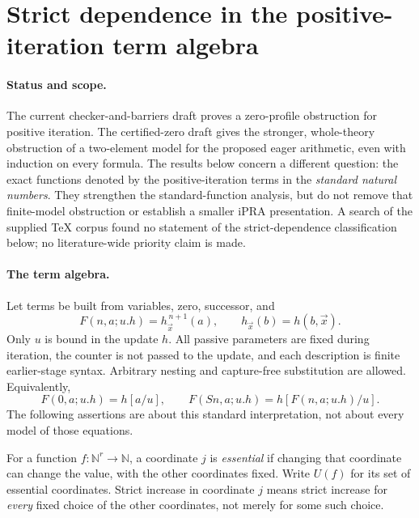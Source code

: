 
\section{Strict dependence in the positive-iteration term algebra}
\label{sec:positive-strict-dependence}

\paragraph{Status and scope.}
The current checker-and-barriers draft proves a zero-profile obstruction
for positive iteration. The certified-zero draft gives the stronger,
whole-theory obstruction of a two-element model for the proposed eager
arithmetic, even with induction on every formula. The results below concern
a different question: the exact functions denoted by the positive-iteration
terms in the \emph{standard natural numbers}. They strengthen the
standard-function analysis, but do not remove that finite-model obstruction
or establish a smaller iPRA presentation. A search of the supplied TeX
corpus found no statement of the strict-dependence classification below;
no literature-wide priority claim is made.

\paragraph{The term algebra.}
Let terms be built from variables, zero, successor, and
\[
 F(n,a;u.h)=h_{\vec x}^{\,n+1}(a),\qquad
 h_{\vec x}(b)=h(b,\vec x).
\]
Only $u$ is bound in the update $h$. All passive parameters are fixed
during iteration, the counter is not passed to the update, and each
description is finite earlier-stage syntax. Arbitrary nesting and
capture-free substitution are allowed. Equivalently,
\[
 F(0,a;u.h)=h[a/u],\qquad
 F(Sn,a;u.h)=h[F(n,a;u.h)/u].
\]
The following assertions are about this standard interpretation, not about
every model of those equations.

For a function $f:\mathbb N^r\to\mathbb N$, a coordinate $j$ is
\emph{essential} if changing that coordinate can change the value, with
the other coordinates fixed. Write $U(f)$ for its set of essential
coordinates. Strict increase in coordinate $j$ means strict increase for
\emph{every} fixed choice of the other coordinates, not merely for some
such choice.

